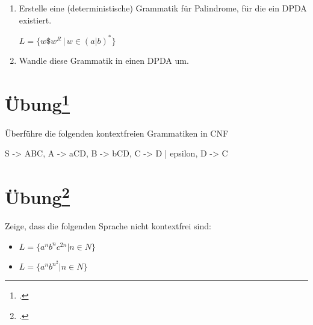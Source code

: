 \documentclass{lehramt-informatik-aufgabe}
\begin{document}
\begin{enumerate}
\item Erstelle eine (deterministische) Grammatik für Palindrome, für die
ein DPDA existiert.

$L = \{ w \$ w^R \, | \, w \in (a|b)^* \}$

\item Wandle diese Grammatik in einen DPDA um.
\end{enumerate}

%

\section{Übung\footcite[Seite 37]{theo:fs:2}}

Überführe die folgenden kontextfreien Grammatiken in CNF

\begin{liProduktionsRegeln}
S -> ABC,
A -> aCD,
B -> bCD,
C -> D | epsilon,
D -> C
\end{liProduktionsRegeln}

%

\section{Übung\footcite[Seite 43]{theo:fs:2}}

Zeige, dass die folgenden Sprache nicht kontextfrei sind:

\begin{itemize}
\item $L = \{ a^n b^n c^{2n} | n \in N \}$
\item $L = \{ a^n b^{n^2} | n \in N \}$
\end{itemize}
\end{document}
